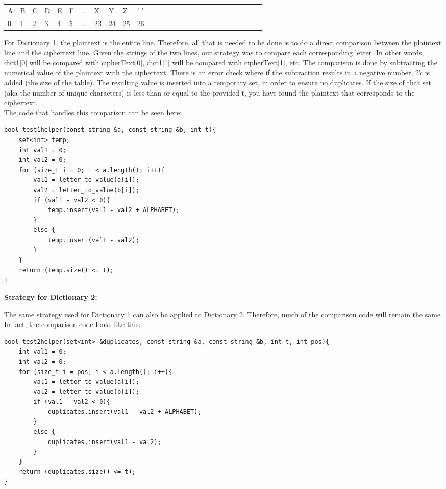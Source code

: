 \documentclass[a4paper,twoside,10pt]{report}
\begin{document}
\begin{table}[h]
\begin{tabular}{lllllllllllllllllllllllllll}
A & B & C & D & E & F & ... &  X  & Y  & Z  & ' ' \\
0 & 1 & 2 & 3 & 4 & 5 & ... &  23 & 24 & 25 & 26
\end{tabular}
\end{table}
For Dictionary 1, the plaintext is the entire line. Therefore, all that is needed to be done is to do a direct comparison between the plaintext line and the ciphertext line. Given the strings of the two lines, our strategy was to compare each corresponding letter. In other words, dict1[0] will be compared with cipherText[0], dict1[1] will be compared with cipherText[1], etc. The comparison is done by subtracting the numerical value of the plaintext with the ciphertext. There is an error check where if the subtraction results in a negative number, 27 is added (the size of the table). The resulting value is inserted into a temporary set, in order to ensure no duplicates. If the size of that set (aka the number of unique characters) is less than or equal to the provided t, you have found the plaintext that corresponds to the ciphertext. \\

\noindent
The code that handles this comparison can be seen here:

\begin{lstlisting}
bool test1helper(const string &a, const string &b, int t){
	set<int> temp;
	int val1 = 0;
	int val2 = 0;
	for (size_t i = 0; i < a.length(); i++){
		val1 = letter_to_value(a[i]);
		val2 = letter_to_value(b[i]);
		if (val1 - val2 < 0){
			temp.insert(val1 - val2 + ALPHABET);
		}
		else {
			temp.insert(val1 - val2);
		}
	}
	return (temp.size() <= t);
}
\end{lstlisting}

\vspace{5mm}
\noindent
\textbf{Strategy for Dictionary 2:}
\vspace{3mm}

The same strategy used for Dictionary 1 can also be applied to Dictionary 2. Therefore, much of the comparison code will remain the same. In fact, the comparison code looks like this:
\begin{lstlisting}
bool test2helper(set<int> &duplicates, const string &a, const string &b, int t, int pos){
	int val1 = 0;
	int val2 = 0;
	for (size_t i = pos; i < a.length(); i++){
		val1 = letter_to_value(a[i]);
		val2 = letter_to_value(b[i]);
		if (val1 - val2 < 0){
			duplicates.insert(val1 - val2 + ALPHABET);
		}
		else {
			duplicates.insert(val1 - val2);
		}
	}
	return (duplicates.size() <= t);
}
\end{lstlisting}
\vspace{5mm}
\end{document}
